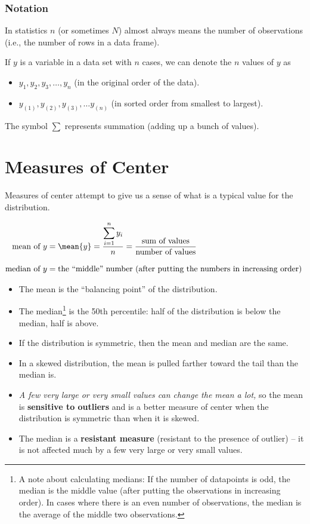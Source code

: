\documentclass[twoside]{book}\usepackage[]{graphicx}\usepackage[]{xcolor}
\def\term#1{\textbf{#1}}
\begin{document}
\subsubsection*{Notation}
In statistics $n$ (or sometimes $N$) almost always means the number 
of observations (i.e., the number of rows in a data frame).

If $y$ is a variable in a data set with $n$ cases, we 
can denote the $n$ values of $y$ as 
\begin{itemize}
\item
$y_1, y_2, y_3, \dots, y_n$ (in the original order of the data).
\item
$y_{(1)}, y_{(2)}, y_{(3)}, \dots y_{(n)}$ (in sorted order from smallest to largest).

\end{itemize}

The symbol $\displaystyle \sum$ represents summation (adding up a bunch of values).

\section{Measures of Center}
Measures of center attempt to give us a sense of what is a
typical value for the distribution.


\begin{align*}
\mbox{mean of $y$} 
&=
\mean{y}
= \frac{\displaystyle \sum_{i = 1}^{n} y_i}{n}
= \frac{\mbox{sum of values}}{\mbox{number of values}}  
\\[3mm]
\mbox{median of $y$}
&=
\mbox{the ``middle'' number (after putting the numbers in increasing order)
} 
\end{align*}

\begin{itemize}
\item
The mean is the ``balancing point'' of the distribution.
\item
The median\footnote{A note about calculating medians: If the number of datapoints is odd, the median is the middle value (after putting the observations in increasing order). In cases where there is an even number of observations, the median is the
  average of the middle two observations.} is the 50th percentile: half of the distribution is below the median,
half is above.
\item
If the distribution is symmetric, then the mean and median are the same.
\item
In a skewed distribution, the mean is pulled farther toward the tail than the median is.
\item
\emph{A few very large or very small values can change the mean a lot,}
so the mean is \term{sensitive to outliers} and is a better measure of center
when the distribution is symmetric than when it is skewed.
\item
The median is a \term{resistant measure} (resistant to the presence of outlier) -- it is not affected much by a few very large or very small values.
\end{itemize}
\end{document}
